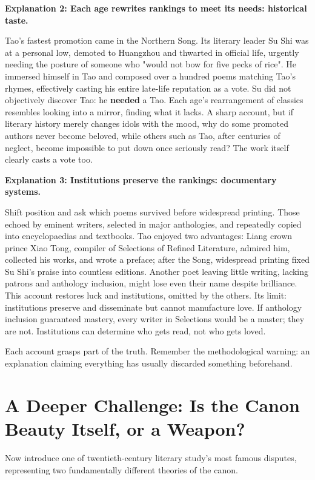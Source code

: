 \textbf{Explanation 2: Each age rewrites rankings to meet its needs: historical taste.}

Tao's fastest promotion came in the Northern Song. Its literary leader Su Shi was at a personal low, demoted to Huangzhou and thwarted in official life, urgently needing the posture of someone who "would not bow for five pecks of rice". He immersed himself in Tao and composed over a hundred poems matching Tao's rhymes, effectively casting his entire late-life reputation as a vote. Su did not objectively discover Tao: he \textbf{needed} a Tao. Each age's rearrangement of classics resembles looking into a mirror, finding what it lacks. A sharp account, but if literary history merely changes idols with the mood, why do some promoted authors never become beloved, while others such as Tao, after centuries of neglect, become impossible to put down once seriously read? The work itself clearly casts a vote too.

\textbf{Explanation 3: Institutions preserve the rankings: documentary systems.}

Shift position and ask which poems survived before widespread printing. Those echoed by eminent writers, selected in major anthologies, and repeatedly copied into encyclopaedias and textbooks. Tao enjoyed two advantages: Liang crown prince Xiao Tong, compiler of Selections of Refined Literature, admired him, collected his works, and wrote a preface; after the Song, widespread printing fixed Su Shi's praise into countless editions. Another poet leaving little writing, lacking patrons and anthology inclusion, might lose even their name despite brilliance. This account restores luck and institutions, omitted by the others. Its limit: institutions preserve and disseminate but cannot manufacture love. If anthology inclusion guaranteed mastery, every writer in Selections would be a master; they are not. Institutions can determine who gets read, not who gets loved.

Each account grasps part of the truth. Remember the methodological warning: an explanation claiming everything has usually discarded something beforehand.

\section[Further Challenge: Beauty or Weapon?]{A Deeper Challenge: Is the Canon Beauty Itself, or a Weapon?}
Now introduce one of twentieth-century literary study's most famous disputes, representing two fundamentally different theories of the canon.

